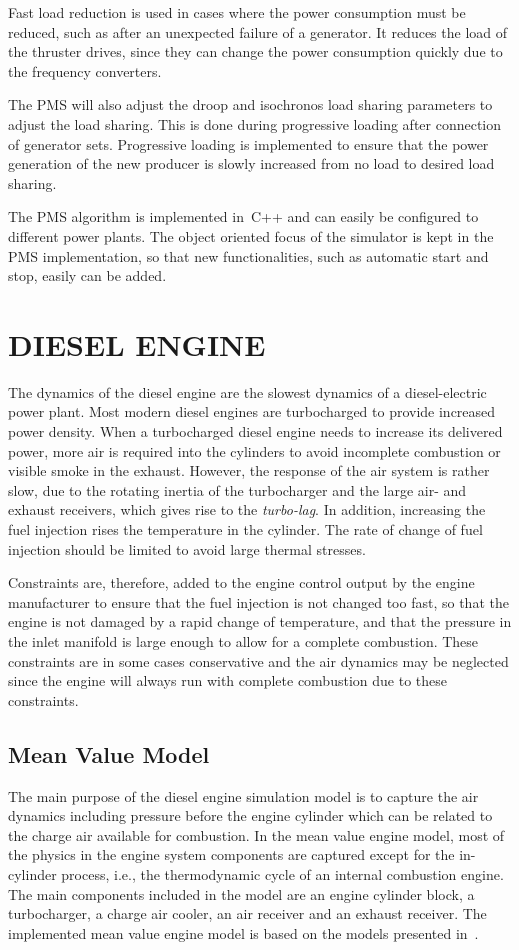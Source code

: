 \documentclass[twocolumn,10pt]{asme2e}
\begin{document}
Fast load reduction is used in cases where the power consumption must be reduced, such as after an unexpected failure of a generator.
It reduces the load of the thruster drives, since they can change the power consumption quickly due to the frequency converters.

The PMS will also adjust the droop and isochronos load sharing parameters to adjust the load sharing.
This is done during progressive loading after connection of generator sets.
Progressive loading is implemented to ensure that the power generation of the new producer is slowly increased from no load to desired load sharing.

The PMS algorithm is implemented in~C++ and can easily be configured to different power plants.
The object oriented focus of the simulator is kept in the PMS implementation, so that new functionalities, such as automatic start and stop, easily can be added.

\section*{\uppercase{Diesel Engine}}
The dynamics of the diesel engine are the slowest dynamics of a diesel-electric power plant. 
Most modern diesel engines are turbocharged to provide increased power density. 
When a turbocharged diesel engine needs to increase its delivered power, more air is required into the cylinders to avoid incomplete combustion or visible smoke in the exhaust.
However, the response of the air system is rather slow, due to the rotating inertia of the turbocharger and the large air- and exhaust receivers, which gives rise to the \textit{turbo-lag}. 
In addition, increasing the fuel injection rises the temperature in the cylinder. 
The rate of change of fuel injection should be limited to avoid large thermal stresses.

Constraints are, therefore, added to the engine control output by the engine manufacturer to ensure that the fuel injection is not changed too fast, so that the engine is not damaged by a rapid change of temperature, and that the pressure in the inlet manifold is large enough to allow for a complete combustion. 
These constraints are in some cases conservative and the air dynamics may be neglected since the engine will always run with complete combustion due to these constraints.

\subsection*{Mean Value Model}
The main purpose of the diesel engine simulation model is to capture the air dynamics including pressure before the engine cylinder which can be related to the charge air available for combustion. 
In the mean value engine model, most of the physics in the engine system components are captured except for the in-cylinder process, i.e., the thermodynamic cycle of an internal combustion engine. The main components included in the model are an engine cylinder block, a turbocharger, a charge air cooler, an air receiver and an exhaust receiver. 
The implemented mean value engine model is based on the models presented in~\cite{Guzzella2010,Chow1999,Heywood1988,Zacharias1967,Yum2013,Pedersen2000}.
\end{document}
